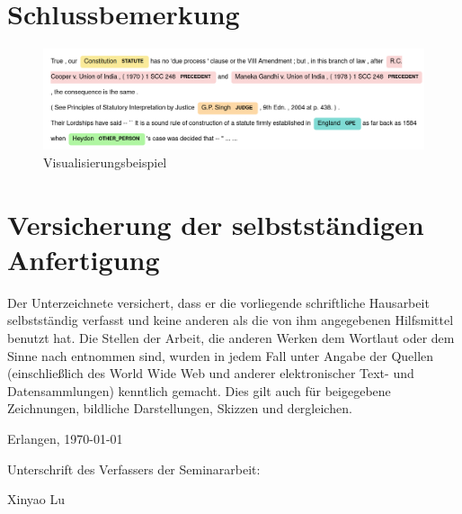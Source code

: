 \documentclass[paper=A4, ngerman, fontsize=12pt]{article}
\begin{document}
	\section{Schlussbemerkung}
	\begin{figure}
		\begin{center}
			\includegraphics[width=15cm]{Illustrations/visualization.png}
			\caption{Visualisierungsbeispiel}
			\label{Visualisierungsbeispiel}
		\end{center}
	\end{figure}
	
	\clearpage
	
	\begin{thebibliography}{9}
		
	\end{thebibliography}
	
	
	\section*{Versicherung der selbstständigen Anfertigung}
	Der Unterzeichnete versichert, dass er die vorliegende schriftliche Hausarbeit selbstständig verfasst und keine anderen als die von ihm angegebenen Hilfsmittel benutzt hat. Die Stellen der Arbeit, die anderen Werken dem Wortlaut oder dem Sinne nach entnommen sind, wurden in jedem Fall unter Angabe der Quellen (einschließlich des World Wide Web und anderer elektronischer Text- und Datensammlungen) kenntlich gemacht. Dies gilt auch für beigegebene Zeichnungen, bildliche Darstellungen, Skizzen und dergleichen. 
	
	\begin{flushright}
		\medskip\noindent
		Erlangen, \today
		
		\noindent
		Unterschrift des Verfassers der Seminararbeit: 
		
		\noindent
		Xinyao Lu
	\end{flushright}
\end{document}
